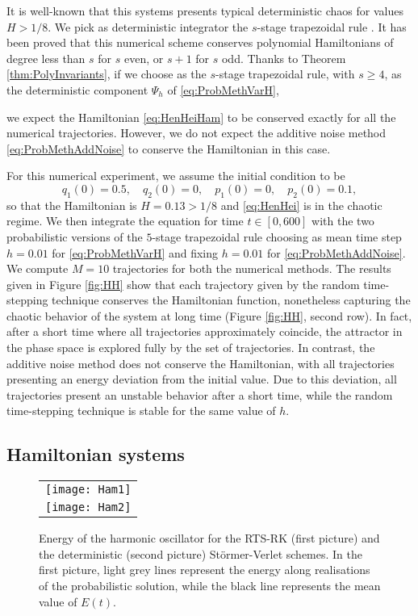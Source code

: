 \documentclass{siamart1116}
\numberwithin{theorem}{section}
\begin{document}
It is well-known that this systems presents typical deterministic chaos for values $H > 1/8$. We pick as deterministic integrator the $s$-stage trapezoidal rule \cite{IaT09}. It has been proved that this numerical scheme conserves polynomial Hamiltonians of degree less than $s$ for $s$ even, or $s + 1$ for $s$ odd. Thanks to Theorem \ref{thm:PolyInvariants}, if we choose as the $s$-stage trapezoidal rule, with $s \geq 4$, as the deterministic component $\Psi_h$ of \eqref{eq:ProbMethVarH}, {we expect the Hamiltonian \eqref{eq:HenHeiHam} to be conserved exactly for all the numerical trajectories. However, we do not expect the additive noise method \eqref{eq:ProbMethAddNoise} to conserve the Hamiltonian in this case.

For this numerical experiment, we assume the initial condition to be
\begin{equation}
	q_1(0) = 0.5,\quad q_2(0) = 0, \quad p_1(0) = 0, \quad p_2(0) = 0.1,
\end{equation}
so that the Hamiltonian is $H = 0.13 > 1/8$ and \eqref{eq:HenHei} is in the chaotic regime. We then integrate the equation for time $t \in [0, 600]$ with the two probabilistic versions of the $5$-stage trapezoidal rule choosing as mean time step $h = 0.01$ for \eqref{eq:ProbMethVarH} and fixing $h = 0.01$ for \eqref{eq:ProbMethAddNoise}. We compute $M = 10$ trajectories for both the numerical methods. The results given in Figure \ref{fig:HH} show that each trajectory given by the random time-stepping technique conserves the Hamiltonian function, nonetheless capturing the chaotic behavior of the system at long time (Figure \ref{fig:HH}, second row). In fact, after a short time where all trajectories approximately coincide, the attractor in the phase space is explored fully by the set of trajectories. In contrast, the additive noise method does not conserve the Hamiltonian, with all trajectories presenting an energy deviation from the initial value. Due to this deviation, all trajectories present an unstable behavior after a short time, while the random time-stepping technique is stable for the same value of $h$.

\subsection{Hamiltonian systems} 

\begin{figure}[t!]
	\begin{center}
		\begin{tabular}{c}
			\texttt{[image: Ham1]} \\
			\texttt{[image: Ham2]}
		\end{tabular}
	\end{center}
	\caption{Energy of the harmonic oscillator for the RTS-RK (first picture) and the deterministic (second picture) Störmer-Verlet schemes. In the first picture, light grey lines represent the energy along realisations of the probabilistic solution, while the black line represents the mean value of $E(t)$.}
	\label{fig:Ham}
\end{figure}

}
\end{document}
